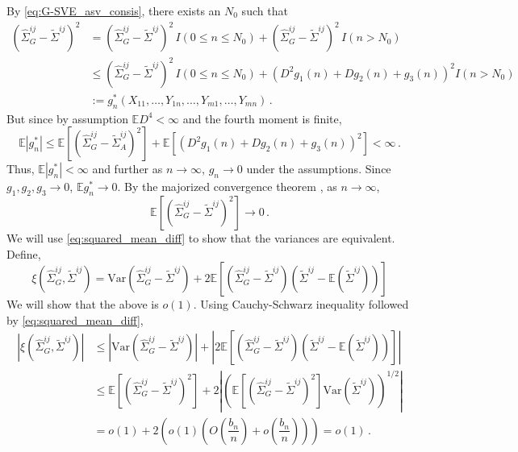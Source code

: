 \documentclass[11pt]{article}
\newcommand{\E}{\mathbb{E}}
\newcommand{\Var}{\text{Var}}
\theoremstyle{remark}
\begin{document}
By \eqref{eq:G-SVE_asv_consis}, there exists an $N_0$ such that
\begin{align*}
\left(\hat{\Sigma}_{G}^{ij} - \tilde{\Sigma}^{ij} \right)^2 &= \left(\hat{\Sigma}_{G}^{ij} - \tilde{\Sigma}^{ij} \right)^2 \, I(0 \leq n \leq N_0) + \left(\hat{\Sigma}_{G}^{ij} - \tilde{\Sigma}^{ij} \right)^2 \, I(n > N_0)\\
& \leq \left(\hat{\Sigma}_{G}^{ij} - \tilde{\Sigma}^{ij} \right)^2 \, I(0 \leq n \leq N_0) +  \left(D^2g_1(n) + Dg_2(n) + g_3(n) \right)^2 I(n > N_0)\\
& := g_n^*(X_{11}, \dots, Y_{1n}, \dots, Y_{m1}, \dots, Y_{mn})\,.
\end{align*}
But since by assumption $\E D^4 <\infty$ and the fourth moment is finite,
\[
\E \left| g_n^* \right| \leq  \E \left[\left(\hat{\Sigma}_{G}^{ij} - \tilde{\Sigma}_{A}^{ij} \right)^2 \right] + \E \left[\left(D^2g_1(n) + Dg_2(n) + g_3(n) \right)^2 \right] < \infty\,.
\]
Thus, $\E \left| g_n^* \right| < \infty$ and further as $n \to \infty$, $g_n \to 0$ under the assumptions. Since $g_1, g_2, g_3 \to 0$, $\E g_n^* \to 0$. By the majorized convergence theorem \citep{zeid:2013}, as $n \to \infty$,
\begin{equation}
\label{eq:squared_mean_diff}
  \E \left[\left(\hat{\Sigma}_{G}^{ij} - \tilde{\Sigma}^{ij} \right)^2 \right] \to 0\,.
\end{equation}
%
We will use \eqref{eq:squared_mean_diff} to show that the variances are equivalent. Define,
\[
\xi\left(\hat{\Sigma}_{G}^{ij}, \tilde{\Sigma}^{ij} \right) = \Var\left(\hat{\Sigma}_{G}^{ij} - \tilde{\Sigma}^{ij} \right) + 2 \E\left[ \left(\hat{\Sigma}_{G}^{ij} -  \tilde{\Sigma}^{ij} \right) \left(\tilde{\Sigma}^{ij}  - \E \left( \tilde{\Sigma}^{ij} \right) \right) \right]
\]
We will show that the above is $o(1)$. Using Cauchy-Schwarz inequality followed by \eqref{eq:squared_mean_diff},
\begin{align*}
\left|  \xi\left(\hat{\Sigma}_{G}^{ij}, \tilde{\Sigma}^{ij} \right) \right| & \leq \left| \Var\left(\hat{\Sigma}_{G}^{ij} -  \tilde{\Sigma}^{ij} \right) \right| + \left| 2 \E\left[ \left(\hat{\Sigma}_{G}^{ij} - \tilde{\Sigma}^{ij} \right) \left(\tilde{\Sigma}^{ij}  - \E \left( \tilde{\Sigma}^{ij} \right) \right) \right]\right| \\ 
& \leq \E\left[\left(\hat{\Sigma}_{G}^{ij} -  \tilde{\Sigma}^{ij} \right)^2 \right] + 2 \left| \left(\E\left[ \left(\hat{\Sigma}_{G}^{ij} - \tilde{\Sigma}^{ij} \right)^2 \right]  \Var\left(\tilde{\Sigma}^{ij}  \right)   \right)^{1/2}\right| \\ 
& = o(1) + 2\left(o(1) \left(O\left( \dfrac{b_n}{n}\right)  + o\left( \dfrac{b_n}{n}\right) \right)  \right) = o(1)\,.
\end{align*}
\end{document}
